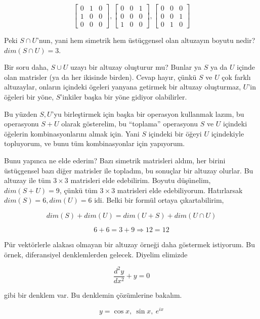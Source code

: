 \documentclass[12pt,fleqn]{article}\usepackage{../../common}
\begin{document}
$$ 
\left[\begin{array}{rrr}
0 & 1 & 0 \\ 1 & 0 & 0 \\ 0 & 0 & 0
\end{array}\right],
\left[\begin{array}{rrr}
0 & 0 & 1 \\ 0 & 0 & 0 \\ 1 & 0 & 0
\end{array}\right],
\left[\begin{array}{rrr}
0 & 0 & 0 \\ 0 & 0 & 1 \\ 0 & 1 & 0
\end{array}\right]
$$

Peki $S \cap U$'nun, yani hem simetrik hem üstüçgensel olan altuzayın
boyutu nedir? $dim(S \cap U)=3$. 

Bir soru daha, $S \cup U$ uzayı bir altuzay oluşturur mu? Bunlar ya $S$ ya
da $U$ içinde olan matrisler (ya da her ikisinde birden). Cevap hayır,
çünkü $S$ ve $U$ çok farklı altuzaylar, onların içindeki ögeleri yanyana
getirmek bir altuzay oluşturmaz, $U$'in öğeleri bir yöne, $S$'inkiler başka
bir yöne gidiyor olabilirler. 

Bu yüzden $S,U$'yu birleştirmek için başka bir operasyon kullanmak lazım,
bu operasyonu $S + U$ olarak gösterelim, bu ``toplama'' operasyonu $S$ ve
$U$ içindeki öğelerin kombinasyonlarını almak için. Yani $S$ içindeki bir
öğeyi $U$ içindekiyle topluyorum, ve bunu tüm kombinasyonlar için
yapıyorum.

Bunu yapınca ne elde ederim? Bazı simetrik matrisleri aldım, her birini
üstüçgensel bazı diğer matrisler ile topladım, bu sonuçlar bir altuzay
olurlar. Bu altuzay ile tüm $3 \times 3$ matrisleri elde edebilirim. Boyutu
düşünelim, $dim(S+U)=9$, çünkü tüm $3 \times 3$ matrisleri elde
edebiliyorum. Hatırlarsak $dim(S)=6,dim(U)=6$ idi. Belki bir formül ortaya
çıkartabilirim,

$$ dim(S) + dim(U) = dim(U+S) + dim(U \cap U) $$

$$ 6 + 6 = 3 + 9 \Rightarrow 12 = 12 $$

Pür vektörlerle alakası olmayan bir altuzay örneği daha göstermek
istiyorum. Bu örnek, diferansiyel denklemlerden gelecek. Diyelim elimizde

$$ \frac{d^2y}{dx^2} + y = 0 $$

gibi bir denklem var. Bu denklemin çözümlerine bakalım. 

$$ y = \cos x,\ \sin x,\ e^{ix} $$ 
\end{document}
